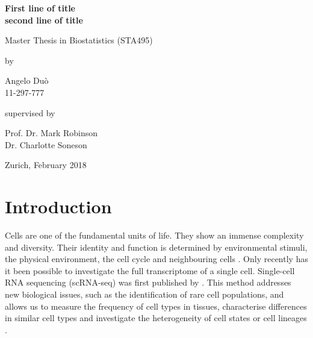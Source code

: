 \documentclass[11pt, a4paper]{article}\usepackage[]{graphicx}\usepackage[]{color}
\begin{document}

\thispagestyle{empty}
\renewcommand{\baselinestretch}{1.5}\normalfont
\begin{center}
\setlength{\parindent}{0cm}
\bf\Large%
First line of title \\
second line of title
\normalfont



\hrulefill

\vspace*{4cm}

\large
Master Thesis in Biostatistics (STA495)
\vspace*{12mm}

by

\vspace*{12mm}

Angelo Du\`o\\
\small 11-297-777\\
\normalfont
\vspace*{4cm}

supervised by

\vspace*{1cm}

Prof. Dr. Mark Robinson\\
Dr. Charlotte Soneson

\vfill

Zurich, February 2018
\end{center}
\renewcommand\familydefault{\rmdefault}%
\renewcommand{\baselinestretch}{1.0}\rm 
\setcounter{page}{0}
\cleardoublepage
\newpage\null\thispagestyle{empty}\newpage
\tableofcontents

\bigskip
\newpage
\section{Introduction}
Cells are one of the fundamental units of life. They show an immense complexity and diversity. Their identity and function is determined by environmental stimuli, the physical environment, the cell cycle and neighbouring cells \citep{wagner2016revealing}. Only recently has it been possible to investigate the full transcriptome of a single cell. Single-cell RNA sequencing (scRNA-seq) was first published by \citet{tang2009mrna}. This method addresses new biological issues, such as the identification of rare cell populations, and allows us to measure the frequency of cell types in tissues, characterise differences in similar cell types and investigate the heterogeneity of cell states or cell lineages \citep{andrews2017identifying}.
\end{document}

